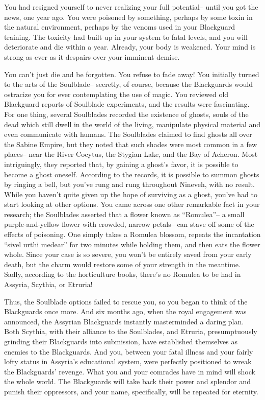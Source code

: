 \documentclass[char]{Kos}
\begin{document}
You had resigned yourself to never realizing your full potential-- until you got the news, one year ago. You were poisoned by something, perhaps by some toxin in the natural environment, perhaps by the venoms used in your Blackguard training. The toxicity had built up in your system to fatal levels, and you will deteriorate and die within a year. Already, your body is weakened. Your mind is strong as ever as it despairs over your imminent demise.

You can't just die and be forgotten. You refuse to fade away! You initially turned to the arts of the Soulblade-- secretly, of course, because the Blackguards would ostracize you for ever contemplating the use of magic. You reviewed old Blackguard reports of Soulblade experiments, and the results were fascinating. For one thing, several Soulblades recorded the existence of ghosts, souls of the dead which still dwell in the world of the living, manipulate physical material and even communicate with humans. The Soulblades claimed to find ghosts all over the Sabine Empire, but they noted that such shades were most common in a few places-- near the River Cocytus, the Stygian Lake, and the Bay of Acheron. Most intriguingly, they reported that, by gaining a ghost’s favor, it is possible to become a ghost oneself. According to the records, it is possible to summon ghosts by ringing a bell, but you’ve rung and rung throughout Nineveh, with no result. While you haven’t quite given up the hope of surviving as a ghost, you’ve had to start looking at other options. You came across one other remarkable fact in your research; the Soulblades asserted that a flower known as “Romulea”-- a small purple-and-yellow flower with crowded, narrow petals-- can stave off some of the effects of poisoning. One simply takes a Romulea blossom, repeats the incantation “sivel urthi medear” for two minutes while holding them, and then eats the flower whole. Since your case is so severe, you won’t be entirely saved from your early death, but the charm would restore some of your strength in the meantime. Sadly, according to the horticulture books, there’s no Romulea to be had in Assyria, Scythia, or Etruria!

Thus, the Soulblade options failed to rescue you, so you began to think of the Blackguards once more. And six months ago, when the royal engagement was announced, the Assyrian Blackguards instantly masterminded a daring plan. Both Scythia, with their alliance to the Soulblades, and Etruria, presumptuously grinding their Blackguards into submission, have established themselves as enemies to the Blackguards. And you, between your fatal illness and your fairly lofty status in Assyria’s educational system, were perfectly positioned to wreak the Blackguards’ revenge. What you and your comrades have in mind will shock the whole world. The Blackguards will take back their power and splendor and punish their oppressors, and your name, specifically, will be repeated for eternity. 
\end{document}
